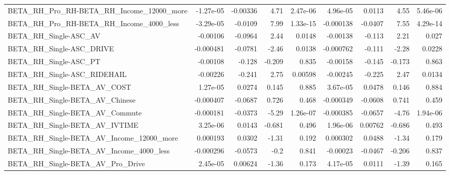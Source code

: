 \begin{tabular}{lrrrrrrrr}
BETA\_RH\_Pro\_RH-BETA\_RH\_Income\_12000\_more           &   -1.27e-05 &     -0.00336 &      4.71 & 2.47e-06 &   4.96e-05 &      0.0113 &         4.55 &      5.46e-06 \\
BETA\_RH\_Pro\_RH-BETA\_RH\_Income\_4000\_less            &   -3.29e-05 &      -0.0109 &      7.99 & 1.33e-15 &  -0.000138 &     -0.0407 &         7.55 &      4.29e-14 \\
BETA\_RH\_Single-ASC\_AV                              &    -0.00106 &      -0.0964 &      2.44 &   0.0148 &   -0.00138 &      -0.113 &         2.21 &         0.027 \\
BETA\_RH\_Single-ASC\_DRIVE                           &   -0.000481 &      -0.0781 &     -2.46 &   0.0138 &  -0.000762 &      -0.111 &        -2.28 &        0.0228 \\
BETA\_RH\_Single-ASC\_PT                              &    -0.00108 &       -0.128 &    -0.209 &    0.835 &   -0.00158 &      -0.145 &       -0.173 &         0.863 \\
BETA\_RH\_Single-ASC\_RIDEHAIL                        &    -0.00226 &       -0.241 &      2.75 &  0.00598 &   -0.00245 &      -0.225 &         2.47 &        0.0134 \\
BETA\_RH\_Single-BETA\_AV\_COST                        &    1.27e-05 &       0.0274 &     0.145 &    0.885 &   3.67e-05 &      0.0478 &        0.146 &         0.884 \\
BETA\_RH\_Single-BETA\_AV\_Chinese                     &   -0.000407 &      -0.0687 &     0.726 &    0.468 &  -0.000349 &     -0.0608 &        0.741 &         0.459 \\
BETA\_RH\_Single-BETA\_AV\_Commute                     &   -0.000181 &      -0.0373 &     -5.29 & 1.26e-07 &  -0.000385 &     -0.0657 &        -4.76 &      1.94e-06 \\
BETA\_RH\_Single-BETA\_AV\_IVTIME                      &    3.25e-06 &       0.0143 &    -0.681 &    0.496 &   1.96e-06 &     0.00762 &       -0.686 &         0.493 \\
BETA\_RH\_Single-BETA\_AV\_Income\_12000\_more           &    0.000193 &       0.0302 &     -1.31 &    0.192 &   0.000302 &      0.0488 &        -1.34 &         0.179 \\
BETA\_RH\_Single-BETA\_AV\_Income\_4000\_less            &   -0.000296 &      -0.0573 &      -0.2 &    0.841 &   -0.00023 &     -0.0467 &       -0.206 &         0.837 \\
BETA\_RH\_Single-BETA\_AV\_Pro\_Drive                   &    2.45e-05 &      0.00624 &     -1.36 &    0.173 &   4.17e-05 &      0.0111 &        -1.39 &         0.165 \\

\end{tabular}
